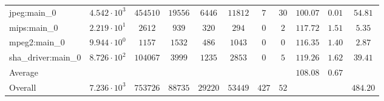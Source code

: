 \begin{tabular}{|l|c|c|c|c|c|c|c|c|c|c|}
jpeg:main\_0            & $ 4.542 \cdot 10^{3}  $ & $ 454510 $ & $ 19556 $ & $ 6446  $ & $ 11812 $ & $ 7   $ & $ 30 $ & $ 100.07      $ & $ 0.01    $ & $ 54.81   $ \\
mips:main\_0            & $ 2.219 \cdot 10^{1}  $ & $ 2612   $ & $ 939   $ & $ 320   $ & $ 294   $ & $ 0   $ & $ 2  $ & $ 117.72      $ & $ 1.51    $ & $ 5.35    $ \\
mpeg2:main\_0           & $ 9.944 \cdot 10^{0}  $ & $ 1157   $ & $ 1532  $ & $ 486   $ & $ 1043  $ & $ 0   $ & $ 0  $ & $ 116.35      $ & $ 1.40    $ & $ 2.87    $ \\
sha\_driver:main\_0     & $ 8.726 \cdot 10^{2}  $ & $ 104067 $ & $ 3999  $ & $ 1235  $ & $ 2853  $ & $ 0   $ & $ 5  $ & $ 119.26      $ & $ 1.62    $ & $ 39.41   $ \\
\hline
Average                 & $                     $ & $        $ & $       $ & $       $ & $       $ & $     $ & $    $ & $ 108.08      $ & $ 0.67    $ & $         $ \\
\hline
Overall                 & $ 7.236 \cdot 10^{3}  $ & $ 753726 $ & $ 88735 $ & $ 29220 $ & $ 53449 $ & $ 427 $ & $ 52 $ & $             $ & $         $ & $ 484.20  $ \\
\hline
\end{tabular}
